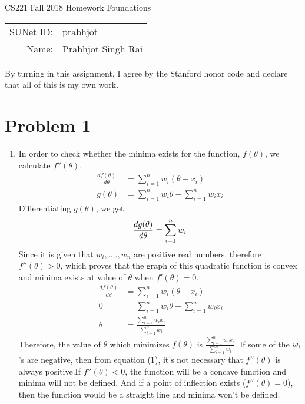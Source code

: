 \documentclass[12pt]{article}
\begin{document}
\begin{center}
{\Large CS221 Fall 2018 Homework Foundations}

\begin{tabular}{rl}
SUNet ID: & prabhjot \\
Name: & Prabhjot Singh Rai
\end{tabular}
\end{center}

By turning in this assignment, I agree by the Stanford honor code and declare
that all of this is my own work.


\section*{Problem 1}
\begin{enumerate}[label=(\alph*)]
\item In order to check whether the minima exists for the function, $f(\theta)$, we calculate $f''(\theta)$.
\begin{equation*}
\begin{split}
\frac{df(\theta)}{d\theta} & = \sum_{i=1}^{n} w_i(\theta - x_i)\\
g(\theta)& = \sum_{i=1}^{n} w_i \theta - \sum_{i=1}^{n} w_i x_i
\end{split}
\end{equation*}
Differentiating $g(\theta)$, we get
\begin{equation}
\frac{dg(\theta)}{d\theta} = \sum_{i=1}^{n} w_i \\
\end{equation}
Since it is given that $w_i, ...., w_n$ are positive real numbers, therefore $f''(\theta) > 0$, which proves that the graph of this quadratic function is convex and minima exists at value of $\theta$ when $f'(\theta) = 0$.
\begin{equation*}\
\begin{split}
\frac{df(\theta)}{d\theta} & =  \sum_{i=1}^{n} w_i(\theta - x_i)\\
0 & = \sum_{i=1}^{n} w_i \theta - \sum_{i=1}^{n} w_i x_i\\
\theta & = \frac{\sum_{i=1}^{n} w_i x_i}{\sum_{i=1}^{n} w_i}
\end{split}
\end{equation*}
Therefore, the value of $\theta$ which minimizes $f(\theta)$ is $ \frac{\sum_{i=1}^{n} w_i x_i}{\sum_{i=1}^{n} w_i}$.
If some of the $w_i$'s are negative, then from equation (1), it's not necessary that $f''(\theta)$ is always positive.If $f''(\theta)<0$, the function will be a concave function and minima will not be defined. And if a point of inflection exists ($f''(\theta) = 0$), then the function would be a straight line and minima won't be defined. \\

\end{enumerate}
\end{document}
